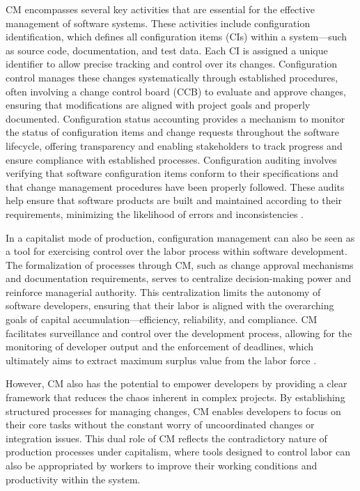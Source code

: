 \begin{refsection}
CM encompasses several key activities that are essential for the effective management of software systems. These activities include configuration identification, which defines all configuration items (CIs) within a system—such as source code, documentation, and test data. Each CI is assigned a unique identifier to allow precise tracking and control over its changes. Configuration control manages these changes systematically through established procedures, often involving a change control board (CCB) to evaluate and approve changes, ensuring that modifications are aligned with project goals and properly documented. Configuration status accounting provides a mechanism to monitor the status of configuration items and change requests throughout the software lifecycle, offering transparency and enabling stakeholders to track progress and ensure compliance with established processes. Configuration auditing involves verifying that software configuration items conform to their specifications and that change management procedures have been properly followed. These audits help ensure that software products are built and maintained according to their requirements, minimizing the likelihood of errors and inconsistencies \cite[pp.~49-51]{babich1986software}.

In a capitalist mode of production, configuration management can also be seen as a tool for exercising control over the labor process within software development. The formalization of processes through CM, such as change approval mechanisms and documentation requirements, serves to centralize decision-making power and reinforce managerial authority. This centralization limits the autonomy of software developers, ensuring that their labor is aligned with the overarching goals of capital accumulation—efficiency, reliability, and compliance. CM facilitates surveillance and control over the development process, allowing for the monitoring of developer output and the enforcement of deadlines, which ultimately aims to extract maximum surplus value from the labor force \cite[pp.~14-16]{hunt2005pragmatic}.

However, CM also has the potential to empower developers by providing a clear framework that reduces the chaos inherent in complex projects. By establishing structured processes for managing changes, CM enables developers to focus on their core tasks without the constant worry of uncoordinated changes or integration issues. This dual role of CM reflects the contradictory nature of production processes under capitalism, where tools designed to control labor can also be appropriated by workers to improve their working conditions and productivity within the system.


\end{refsection}
